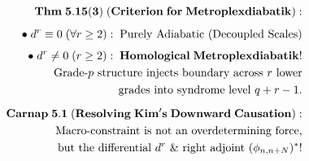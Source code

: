 \documentclass[preview]{standalone}
\begin{document}
\begin{align*}
\special{dvisvgm:raw <g id='unique000'>}\mathbf{Thm\;5.15(3)\;(Criterion\;for\;Metroplexdiabatik):}\\[5pt]\bullet\;d^r \equiv 0\;(\forall r\ge 2):\;\text{Purely Adiabatic (Decoupled Scales)}\\[4pt]\bullet\;d^r \neq 0\;(r\ge 2):\;\mathbf{Homological\;Metroplexdiabatik!}\\\;\;\text{Grade-}p\text{ structure injects boundary across }r\text{ lower}\\\;\;\text{grades into syndrome level }q+r-1.\\[6pt]\mathbf{Carnap\;5.1\;(Resolving\;Kim's\;Downward\;Causation):}\\\text{Macro-constraint is not an overdetermining force,}\\\text{but the differential }d^r\text{ \& right adjoint }(\phi_{n,n+N})^*!\special{dvisvgm:raw </g>}
\end{align*}
\end{document}
